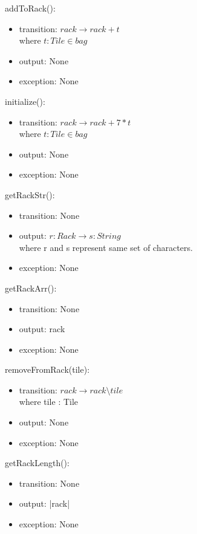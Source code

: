 \documentclass[12pt]{article}
\begin{document}
\noindent addToRack():
\begin{itemize}
\item transition: $rack \rightarrow rack + t$ \\
        where $t : Tile \in bag$
\item output: None
\item exception: None
\end{itemize}

\noindent initialize():
\begin{itemize}
\item transition: $rack \rightarrow rack + 7*t$ \\
        where $t : Tile \in bag$
\item output: None
\item exception: None
\end{itemize}

\newpage

\noindent getRackStr():
\begin{itemize}
\item transition: None
\item output: $r:Rack \rightarrow s:String$ \\
where r and s represent same set of characters.
\item exception: None
\end{itemize}

\noindent getRackArr():
\begin{itemize}
\item transition: None
\item output: rack
\item exception: None
\end{itemize}

\noindent removeFromRack(tile):
\begin{itemize}
\item transition: $rack \rightarrow rack \setminus tile$ \\
where tile : Tile
\item output: None
\item exception: None
\end{itemize}

\noindent getRackLength():
\begin{itemize}
\item transition: None
\item output: |rack|
\item exception: None
\end{itemize}
\end{document}
